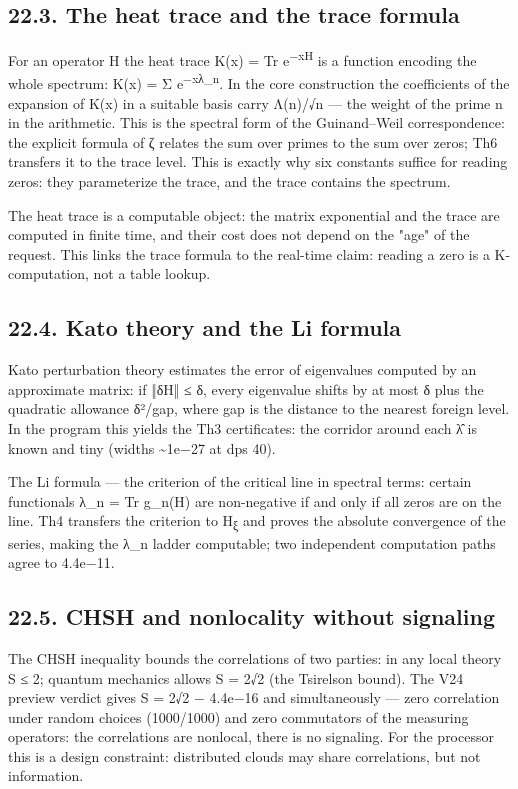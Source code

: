 \documentclass[11pt,a4paper]{article}
\begin{document}
\subsection{22.3. The heat trace and the trace formula}

For an operator H the heat trace K(x) = Tr e\textsuperscript{−xH} is a function encoding the whole spectrum: K(x) = Σ e\textsuperscript{−xλ\_n}. In the core construction the coefficients of the expansion of K(x) in a suitable basis carry Λ(n)/√n — the weight of the prime n in the arithmetic. This is the spectral form of the Guinand–Weil correspondence: the explicit formula of ζ relates the sum over primes to the sum over zeros; Th6 transfers it to the trace level. This is exactly why six constants suffice for reading zeros: they parameterize the trace, and the trace contains the spectrum.

The heat trace is a computable object: the matrix exponential and the trace are computed in finite time, and their cost does not depend on the "age" of the request. This links the trace formula to the real-time claim: reading a zero is a K-computation, not a table lookup.

\subsection{22.4. Kato theory and the Li formula}

Kato perturbation theory estimates the error of eigenvalues computed by an approximate matrix: if ‖δH‖ ≤ δ, every eigenvalue shifts by at most δ plus the quadratic allowance δ²/gap, where gap is the distance to the nearest foreign level. In the program this yields the Th3 certificates: the corridor around each λ̂ is known and tiny (widths \textasciitilde{}1e−27 at dps 40).

The Li formula — the criterion of the critical line in spectral terms: certain functionals λ\_n = Tr g\_n(H) are non-negative if and only if all zeros are on the line. Th4 transfers the criterion to H\textsubscript{ξ} and proves the absolute convergence of the series, making the λ\_n ladder computable; two independent computation paths agree to 4.4e−11.

\subsection{22.5. CHSH and nonlocality without signaling}

The CHSH inequality bounds the correlations of two parties: in any local theory S ≤ 2; quantum mechanics allows S = 2√2 (the Tsirelson bound). The V24 preview verdict gives S = 2√2 − 4.4e−16 and simultaneously — zero correlation under random choices (1000/1000) and zero commutators of the measuring operators: the correlations are nonlocal, there is no signaling. For the processor this is a design constraint: distributed clouds may share correlations, but not information.
\end{document}
